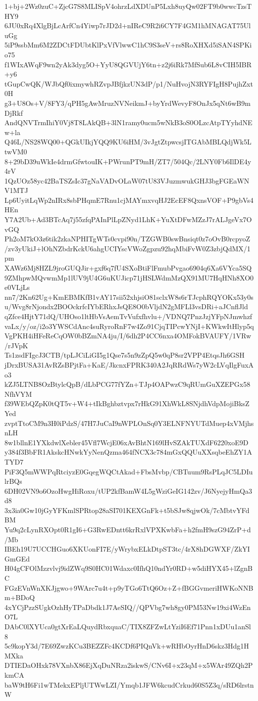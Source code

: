 1+bj+2Wz0zuC+ZjcG7S8MLISpV4ohrzLdXDUnP5Lxh8uyQw02FT9b0wwcTzsTHY9
6JU0xRq4XlgBjLcArfCn4Yiwp7rJD2d+nIReC9R2i6CY7F4GM1hMNAGAT75UluGg
5iP9ssbMm6M2ZDCtFDUbtKlPxVfVlwwC1hC9S3seV+rs8RoXHXd5iSAN4SPKio75
f1WIxAWqF9wn2yAk3dyg5O+YyU8QGVUjY6tn+z2j6iRk7MfSub6L8vCIH5IBR+y6
tGupCwQK/WJbQf0ixmywhRZvpJBfjkzUN3dP/p1/NuHvojN3RYFIgH8PujhZxt0H
g3+U8Os+V/8FY3/qPH5gAwMruzNVNeikmJ+byYrdWevyF8OnJx5qNt6wB9mDjRkf
AndQNVTrmIhiY0Vj8T8LAkQB+3lN1ramy0ucm5wNkB3oS0OLzcAtpTYyhdNEw+la
Q46L/NS28WQ00+QGkUIkjYQQ9KU6iHM/3vJgtZtpwcsjITGAbMBLQdjWk5LtwVM0
8+29bD39uWkIe4drmGfwtouIK+PWrunPT9mH/ZT7/504Qc/2LNY0Fb6IlDE4y4rV
1QzUOz58yc42BaTSZsIc37gNaVADvOLaW07tU83VJuzmwukGHJ3bgFGEaWNV1MTJ
Lp6UyitLqWp2nIRx8sbPHqmE7Rnu1cjMAYmxvqHJ2EcEF8QxnsVOF+P9gbVs4HEn
Y7A2Ub+Ad3BTcAq7j55zfqPAInPlLpZNyd1LhK+YuXtDFwMZzJ7rALJgeVx7OvGQ
Ph2oM7kO3z6tik2zkaNPHITgWTs0cvpi90n/TZGWB0swBnsiqt0z7oOvB0rcpyoZ
/zv3yUkiJ+lOhNZbdrKckU6ahgUCIYscVWoZgpzu92hqMbiFvW0Z3zbjQdMX/1pm
XAWz6Mj8HZL9jroGUQJir+gxf6q7fU4SXoBtiFlFmubPvgao6904q6Xa6VYca5SQ
9ZMhpwMQvwmMp1lUV9jU4G6uKUJicp71jHSLWdmMzQX91MU7HqHNh8XO0e0VLjLs
nn7/2Kn62Ug+KmEBMKfB1vAY17sii52xhjsiO81sclxW8s6rTJcphRQYOKx53y0s
u/Wvg8rNjondx2BOOckrfcIYbERhxJsQE8O0bVljdN2gMFLl3vsDRi+aJCnflJld
qZfce4HjtY71dQ/UHOso1ltHbVsAemTvVufxfhvlu+/VDNQ7PnzJzjYFpNJmwhzf
vaLx/y/oz/i2o3YWSCdAnc4suRyroRnF7w4Zo91CjqTIPcwYNjI+KWkwItHlyp5q
VgPKH4iHFeReCqOW0bBZmNA4ju/I/6dh2P4CC6nxa4OMFokBVAUFY/1VRw/rJVpK
Ts1zsdFIgcJ3CTB/tpLJCiLiGI5g1Qse7s5n9zZpQ5w0qP8sr2VPP4EtqsJh6GSH
jDrxBUSA31AvRZsBPjtFa+KaE/JkcnxFPRK340A2JqRRdWs7yW2cLVqIlgFuxAo3
kZJ5LTNB8OzBtylcQpB/dLbPCG77fYZn+TJp4OAPwzC9qRUmGuXZEPGx58NfhVYM
f39WEbQZpK0tQT5v+W4+tIkBghbztvpx7rHkG91XhWkL8SNjdhVdpMojiBksZYed
zvptTtoCM9n3H0iPdzS/47H7JuCaI9nWPLOnSq0Y3ELNFNYUTdMuep4xVMjhsnLH
8w1bllnE1YXkdwlXebler45Vfl7WcjE06xAvBhtN169lHvSZAkTUXdF6220xoE9D
y384f3BbFR1AkskcHNwkYyNenQzma464fNCX3c784mGxQQUuXXsqbeEhZY1ATYD7
PiF3Q5mWWPqRtciyzE0GqegWQCtAkad+FbsMvbp/CBTuum9RsPLqJC5LDIulrBQs
6DH02VN9o6OzoHwgHiRoxu/tUP2kfBamW4L5gWziGeIG142zv/J6NyejyHmQa3d8
3x3ia0Gw10jGyYFKmlSPRtop28aSI701KEXGnFk+t5bSJw8qjwOk/7cMbtvYFdBM
Yu9q2cLynRXOpt0R1gI6+G3RwEDntt6krRxlVPXKwbFa+h2fmH9szG94ZrP+d/Mb
IBEh19U7UCCHGuo6XKUonFI7E/yWrybxELkDtpST3tc/4rX8hDGWXF/ZkYIGmGEd
H04gCFOlMzzvlvj9idZWq9S0HC01Wdaxc0IfhQ10ndYr0RD+w5diHYX45+lZgnBC
FGzEVnWnXKJjgwo+9WArc7u4t+p9yTGo6TtQ6Oz+Z+fBGGvmeriHWKoNNBm+BDoQ
4xYCjPzzSUgkOzhHyTPaDbdk1J7AeSIQ//QPVbg7wh8gy0PM53Nw19xi4WzEnO7L
DAbC0lXYUca0gtXrEaLQuydRbxquaC/TIX8ZFZwLtYziI6Ef71Pnn1xDUu1anSl8
5c9kopY3d/7E69ZwzKCu3BEZZFc4KCDf6PIQnVk+wRHbOyrHnD6skz3Hdg1HMXka
DTIEDaOHxk78VXnbX86EjXqDuNRza2iskwS/CNv6I+x23qM+x5WAr49ZQh2PkmCA
baW9tH6Fi1wTMekxEPljUTWwLZI/Ymqb1JFW6kcudCrkud60S5Z3q/sRD6lrstnW
